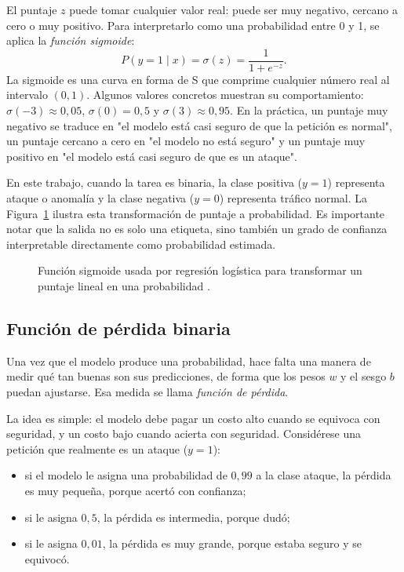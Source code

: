 \documentclass[12pt,oneside]{report}
\begin{document}
El puntaje $z$ puede tomar cualquier valor real: puede ser muy negativo,
cercano a cero o muy positivo. Para interpretarlo como una probabilidad
entre 0 y 1, se aplica la \textit{función sigmoide}:
\[
P(y=1\mid x)=\sigma(z)=\frac{1}{1+e^{-z}}.
\]
La sigmoide es una curva en forma de S que comprime cualquier número real
al intervalo $(0,1)$. Algunos valores concretos muestran su comportamiento:
$\sigma(-3)\approx 0{,}05$, $\sigma(0)=0{,}5$ y $\sigma(3)\approx 0{,}95$.
En la práctica, un puntaje muy negativo se traduce en "el modelo está casi
seguro de que la petición es normal", un puntaje cercano a cero en "el modelo
no está seguro" y un puntaje muy positivo en "el modelo está casi seguro de
que es un ataque".

En este trabajo, cuando la tarea es binaria, la clase positiva ($y=1$)
representa ataque o anomalía y la clase negativa ($y=0$) representa tráfico
normal. La Figura~\ref{fig:sigmoid} ilustra esta transformación de puntaje a
probabilidad. Es importante notar que la salida no es solo una etiqueta, sino
también un grado de confianza interpretable directamente como probabilidad
estimada.

\begin{figure}[H]
\centering
{}
\caption{Función sigmoide usada por regresión logística para transformar un
puntaje lineal en una probabilidad \cite{islr_logreg}.}
\label{fig:sigmoid}
\end{figure}

\subsection{Función de pérdida binaria}

Una vez que el modelo produce una probabilidad, hace falta una manera de
medir qué tan buenas son sus predicciones, de forma que los pesos $w$ y el
sesgo $b$ puedan ajustarse. Esa medida se llama \textit{función de pérdida}.

La idea es simple: el modelo debe pagar un costo alto cuando se
equivoca con seguridad, y un costo bajo cuando acierta con seguridad.
Considérese una petición que realmente es un ataque ($y=1$):
\begin{itemize}
  \item si el modelo le asigna una probabilidad de $0{,}99$ a la clase
        ataque, la pérdida es muy pequeña, porque acertó con confianza;
  \item si le asigna $0{,}5$, la pérdida es intermedia, porque dudó;
  \item si le asigna $0{,}01$, la pérdida es muy grande, porque estaba
        seguro y se equivocó.
\end{itemize}
\end{document}
